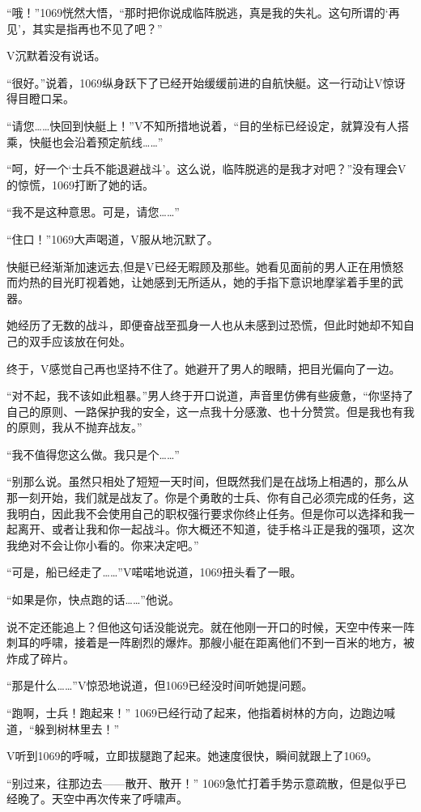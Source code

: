 “哦！”1069恍然大悟，“那时把你说成临阵脱逃，真是我的失礼。这句所谓的‘再见’，其实是指再也不见了吧？”

V沉默着没有说话。

“很好。”说着，1069纵身跃下了已经开始缓缓前进的自航快艇。这一行动让V惊讶得目瞪口呆。

“请您……快回到快艇上！”V不知所措地说着，“目的坐标已经设定，就算没有人搭乘，快艇也会沿着预定航线……”

“呵，好一个‘士兵不能退避战斗’。这么说，临阵脱逃的是我才对吧？”没有理会V的惊慌，1069打断了她的话。

“我不是这种意思。可是，请您……”

“住口！”1069大声喝道，V服从地沉默了。

快艇已经渐渐加速远去,但是V已经无暇顾及那些。她看见面前的男人正在用愤怒而灼热的目光盯视着她，让她感到无所适从，她的手指下意识地摩挲着手里的武器。

她经历了无数的战斗，即便奋战至孤身一人也从未感到过恐慌，但此时她却不知自己的双手应该放在何处。

终于，V感觉自己再也坚持不住了。她避开了男人的眼睛，把目光偏向了一边。

“对不起，我不该如此粗暴。”男人终于开口说道，声音里仿佛有些疲惫，“你坚持了自己的原则、一路保护我的安全，这一点我十分感激、也十分赞赏。但是我也有我的原则，我从不抛弃战友。”

“我不值得您这么做。我只是个……”

“别那么说。虽然只相处了短短一天时间，但既然我们是在战场上相遇的，那么从那一刻开始，我们就是战友了。你是个勇敢的士兵、你有自己必须完成的任务，这我明白，因此我不会使用自己的职权强行要求你终止任务。但是你可以选择和我一起离开、或者让我和你一起战斗。你大概还不知道，徒手格斗正是我的强项，这次我绝对不会让你小看的。你来决定吧。”

“可是，船已经走了……”V喏喏地说道，1069扭头看了一眼。

“如果是你，快点跑的话……”他说。

说不定还能追上？但他这句话没能说完。就在他刚一开口的时候，天空中传来一阵刺耳的呼啸，接着是一阵剧烈的爆炸。那艘小艇在距离他们不到一百米的地方，被炸成了碎片。

“那是什么……”V惊恐地说道，但1069已经没时间听她提问题。

“跑啊，士兵！跑起来！” 1069已经行动了起来，他指着树林的方向，边跑边喊道，“躲到树林里去！”

V听到1069的呼喊，立即拔腿跑了起来。她速度很快，瞬间就跟上了1069。

“别过来，往那边去——散开、散开！” 1069急忙打着手势示意疏散，但是似乎已经晚了。天空中再次传来了呼啸声。

